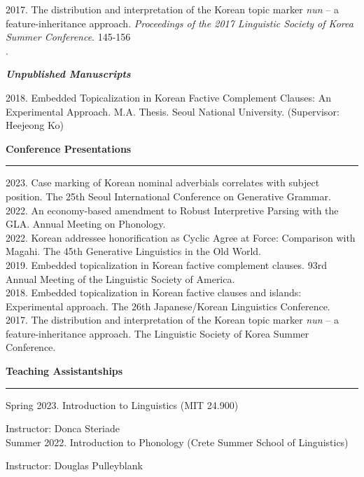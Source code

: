 \documentclass[11pt]{article}
\newcommand{\sect}[1]{{\fontsize{15}{25}\selectfont \textbf{#1}} {\vspace{0.1cm}} \hrule {\vspace{0.3cm}}}
\newcommand{\subsect}[1]{{\fontsize{12}{18}\selectfont \textit{\textbf{#1}}} {\vspace{0.3cm}}}
\begin{document}
{2017. The distribution and interpretation of the Korean topic marker \textit{nun} -- a feature-inheritance approach. \textit{Proceedings of the 2017 Linguistic Society of Korea Summer Conference}. 145-156\\.

\subsect{Unpublished Manuscripts}

2018. Embedded Topicalization in Korean Factive Complement Clauses: An Experimental Approach. M.A. Thesis. Seoul National University. (Supervisor: Heejeong Ko)


{\pagebreak}

\sect{Conference Presentations}

{2023. Case marking of Korean nominal adverbials correlates with subject position. The 25th Seoul International Conference on Generative Grammar.}\\

{2022. An economy-based amendment to Robust Interpretive Parsing with the GLA. Annual Meeting on Phonology.}\\

{2022. Korean addressee honorification as Cyclic Agree at Force: Comparison with Magahi. The 45th Generative Linguistics in the Old World.}\\

{2019. Embedded topicalization in Korean factive complement clauses. 93rd Annual Meeting of the Linguistic Society of America.}\\

{2018. Embedded topicalization in Korean factive clauses and islands: Experimental approach. The 26th Japanese/Korean Linguistics Conference.}\\

{2017. The distribution and interpretation of the Korean topic marker \textit{nun} -- a feature-inheritance approach. The Linguistic Society of Korea Summer Conference.}

{\vspace{1cm}}

\sect{Teaching Assistantships}

Spring 2023. Introduction to Linguistics (MIT 24.900)

{\hphantom{Spring 2023.}} Instructor: Donca Steriade\\

Summer 2022. Introduction to Phonology (Crete Summer School of Linguistics)

{\hphantom{Summer 2022.}} Instructor: Douglas Pulleyblank\\

}
\end{document}
